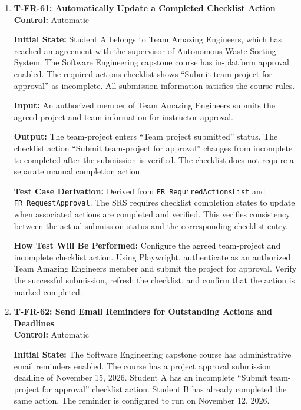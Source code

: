 \documentclass[12pt, titlepage]{article}
\begin{document}
\begin{enumerate}
\item \label{T-FR-61}\textbf{T-FR-61: Automatically Update a Completed Checklist Action}\\

\textbf{Control:} Automatic

\textbf{Initial State:} Student A belongs to Team Amazing Engineers, which has reached an agreement with the supervisor of Autonomous Waste Sorting System. The Software Engineering capstone course has in-platform approval enabled. The required actions checklist shows ``Submit team-project for approval'' as incomplete. All submission information satisfies the course rules.

\textbf{Input:} An authorized member of Team Amazing Engineers submits the agreed project and team information for instructor approval.

\textbf{Output:} The team-project enters ``Team project submitted'' status. The checklist action ``Submit team-project for approval'' changes from incomplete to completed after the submission is verified. The checklist does not require a separate manual completion action.

\textbf{Test Case Derivation:} Derived from \texttt{FR\_RequiredActionsList} and \texttt{FR\_RequestApproval}. The SRS requires checklist completion states to update when associated actions are completed and verified. This verifies consistency between the actual submission status and the corresponding checklist entry.

\textbf{How Test Will Be Performed:} Configure the agreed team-project and incomplete checklist action. Using Playwright, authenticate as an authorized Team Amazing Engineers member and submit the project for approval. Verify the successful submission, refresh the checklist, and confirm that the action is marked completed.

\item \label{T-FR-62}\textbf{T-FR-62: Send Email Reminders for Outstanding Actions and Deadlines}\\

\textbf{Control:} Automatic

\textbf{Initial State:} The Software Engineering capstone course has administrative email reminders enabled. The course has a project approval submission deadline of November 15, 2026. Student A has an incomplete ``Submit team-project for approval'' checklist action. Student B has already completed the same action. The reminder is configured to run on November 12, 2026.


\end{enumerate}
\end{document}
